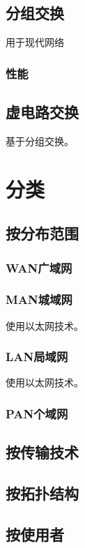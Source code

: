 \subsection{分组交换}
用于现代网络

\subsubsection{性能}


\subsection{虚电路交换}
基于分组交换。



\section{分类}

\subsection{按分布范围}

\subsubsection{WAN广域网}

\subsubsection{MAN城域网}
使用以太网技术。

\subsubsection{LAN局域网}
使用以太网技术。

\subsubsection{PAN个域网}


\subsection{按传输技术}


\subsection{按拓扑结构}


\subsection{按使用者}


